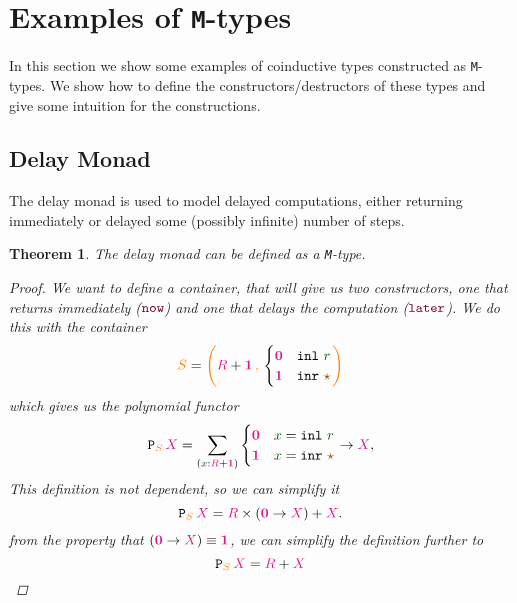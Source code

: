 \documentclass[twoside,11pt,openright]{report}
\theoremstyle{plain} %
\newtheorem{thm}{Theorem}[section]
\theoremstyle{definition}
\theoremstyle{remark}
\newcommand*{\term}[1]{\textcolor{green!30!black}{#1}} %
\newcommand*{\type}[1]{\textcolor{magenta!90!black}{#1}}
\newcommand*{\container}[1]{\textcolor{orange}{#1}}
\newcommand*{\containerpair}[2]{\ensuremath{\colorlet{savedleftcolor}{.}\color{orange}\left(\color{savedleftcolor}#1\,\textcolor{orange}{\mathbf{,}}\,#2\color{orange}\right)\color{savedleftcolor}}}
\newcommand*{\unit}{\type{\textbf{1}}}
\newcommand*{\empt}{\type{\textbf{0}}}
\newcommand*{\constant}[1]{\textcolor{orange!60!black}{\ensuremath{\mathtt{#1}}}}
\newcommand*{\constructor}[1]{\textcolor{purple!60!black}{\ensuremath{\mathtt{#1}}}}
\newcommand*{\functor}[1]{\ensuremath{\mathbf{\mathtt{#1}}}}
\newcommand*{\unitelem}{\constant{\star}} %
\begin{document}
\section{Examples of \texttt{M}-types}
\label{ch:M-types-examples}
In this section we show some examples of coinductive types constructed as \texttt{M}-types. We show how to define the constructors/destructors of these types and give some intuition for the constructions.

\subsection{Delay Monad}
The delay monad is used to model delayed computations, either returning immediately or delayed some (possibly infinite) number of steps.
\begin{thm}
  The delay monad can be defined as a \texttt{M}-type.
  \begin{proof}
    We want to define a container, that will give us two constructors, one that returns immediately (\(\constructor{now}\)) and one that delays the computation (\(\constructor{later}\)). We do this with the container
    \begin{equation}
      \container{S} = \containerpair{\type{R} +\unit}{\begin{cases} \empt & \mathtt{inl}~\term{r} \\ \unit & \mathtt{inr}~\unitelem \end{cases}}
    \end{equation}
    which gives us the polynomial functor
    \begin{equation}
      \functor{P}_{\container{S}}\,\type{X} = \sum_{(\term{x} : \type{R} + \unit)} \begin{cases} \empt & \term{x} = \mathtt{inl}~\term{r} \\ \unit & \term{x} = \mathtt{inr}~\unitelem \end{cases} \rightarrow \type{X},
    \end{equation}
    This definition is not dependent, so we can simplify it 
    \begin{equation}
      \functor{P}_{\container{S}}\,\type{X} = \type{R} \times (\empt \rightarrow \type{X}) + \type{X}.
    \end{equation}
    from the property that \((\empt \rightarrow \type{X}) \equiv \unit\), we can simplify the definition further to
    \begin{equation}
      \functor{P}_{\container{S}}\,\type{X} = \type{R} + \type{X}
    \end{equation}

\end{proof}
\end{thm}
\end{document}
